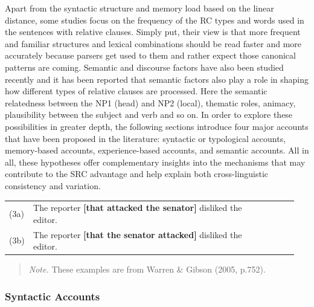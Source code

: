 \documentclass[
]{article}
\begin{document}
Apart from the syntactic structure and memory load based on the linear
distance, some studies focus on the frequency of the RC types and words
used in the sentences with relative clauses. Simply put, their view is
that more frequent and familiar structures and lexical combinations
should be read faster and more accurately because parsers get used to
them and rather expect those canonical patterns are coming. Semantic and
discourse factors have also been studied recently and it has been
reported that semantic factors also play a role in shaping how different
types of relative clauses are processed. Here the semantic relatedness
between the NP1 (head) and NP2 (local), thematic roles, animacy,
plausibility between the subject and verb and so on. In order to explore
these possibilities in greater depth, the following sections introduce
four major accounts that have been proposed in the literature: syntactic
or typological accounts, memory-based accounts, experience-based
accounts, and semantic accounts. All in all, these hypotheses offer
complementary insights into the mechanisms that may contribute to the
SRC advantage and help explain both cross-linguistic consistency and
variation.

\vspace*{1em}

\setlength{\parindent}{0pt}
\noindent
\begin{tabular}[t]{@{}p{0.05\linewidth} p{0.75\linewidth} >{\raggedleft\arraybackslash}p{0.15\linewidth}@{}}
(3a) & The reporter \textbf{[that attacked the senator]} disliked the editor. & [SRC] \\
(3b) & The reporter \textbf{[that the senator attacked]} disliked the editor. & [ORC] \\
\end{tabular}

\vspace*{0.5em}

\noindent
\begin{quote}
\small
\textit{Note.} These examples are from Warren \& Gibson (2005, p.752).
\end{quote}

\vspace*{1em}

\clearpage

\setlength{\parindent}{1.27cm}

\subsubsection{Syntactic Accounts}\label{syntactic-accounts}
\end{document}
